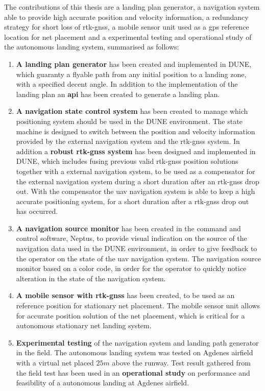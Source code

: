 The contributions of this thesis are a landing plan generator, a navigation system able to provide high accurate position and velocity information, a redundancy strategy for short loss of \gls{rtk-gnss}, a mobile sensor unit used as a \gls{gps} reference location for net placement and a experimental testing and operational study of the autonomous landing system, summarised as follows:
\begin{enumerate}
\item \textbf{A landing plan generator} has been created and implemented in DUNE, which guaranty a flyable path from any initial position to a landing zone, with a specified decent angle. In addition to the implementation of the landing plan an \textbf{\gls{api}} has been created to generate a landing plan.
\item \textbf{A navigation state control system} has been created to manage which positioning system should be used in the DUNE environment. The state machine is designed to switch between the position and velocity information provided by the external navigation system and the \gls{rtk-gnss} system. In addition a \textbf{robust \gls{rtk-gnss} system} has been designed and implemented in DUNE, which includes fusing previous valid \gls{rtk-gnss} position solutions together with a external navigation system, to be used as a compensator for the external navigation system during a short duration after an \gls{rtk-gnss} drop out. With the compensator the \gls{uav} navigation system is able to keep a high accurate positioning system, for a short duration after a \gls{rtk-gnss} drop out has occurred.
\item \textbf{A navigation source monitor} has been created in the command and control software, Neptus, to provide visual indication on the source of the navigation data used in the DUNE environment, in order to give feedback to the operator on the state of the \gls{uav} navigation system. The navigation source monitor based on a color code, in order for the operator to quickly notice alteration in the state of the navigation system.
\item \textbf{A mobile sensor with \gls{rtk-gnss}} has been created, to be used as an reference position for stationary net placement. The mobile sensor unit allows for accurate position solution of the net placement, which is critical for a autonomous stationary net landing system.
\item \textbf{Experimental testing} of the navigation system and landing path generator in the field. The autonomous landing system was tested on Agdenes airfield with a virtual net placed $25 m$ above the runway. Test result gathered from the field test has been used in an \textbf{operational study} on performance and  feasibility of a autonomous landing at Agdenes airfield.
\end{enumerate}
